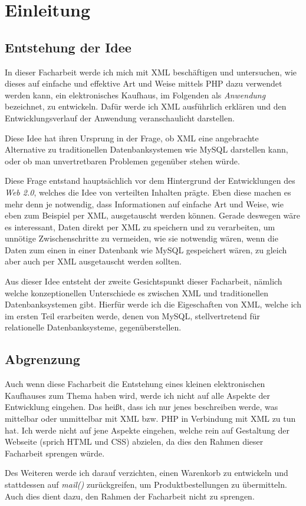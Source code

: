 
\chapter{Einleitung}
\section{Entstehung der Idee}
In dieser Facharbeit werde ich mich mit XML beschäftigen und
untersuchen, wie dieses auf einfache und effektive Art und Weise
mittels PHP dazu verwendet werden kann, ein elektronisches Kaufhaus,
im Folgenden als {\em Anwendung} bezeichnet, zu entwickeln. Dafür werde
ich XML ausführlich erklären und den Entwicklungsverlauf der Anwendung
veranschaulicht darstellen.

Diese Idee hat ihren Ursprung in der Frage, ob XML eine angebrachte
Alternative zu traditionellen Datenbanksystemen wie MySQL darstellen
kann, oder ob man unvertretbaren Problemen gegenüber stehen würde.

Diese Frage entstand hauptsächlich vor dem Hintergrund der
Entwicklungen des {\em Web 2.0}, welches die Idee von verteilten
Inhalten prägte. Eben diese machen es mehr denn je notwendig, dass
Informationen auf einfache Art und Weise, wie eben zum Beispiel per XML,
ausgetauscht werden können. Gerade deswegen wäre es interessant, Daten
direkt per XML zu speichern und zu verarbeiten, um unnötige
Zwischenschritte zu vermeiden, wie sie notwendig wären, wenn die Daten
zum einen in einer Datenbank wie MySQL gespeichert wären, zu gleich
aber auch per XML ausgetauscht werden sollten.

Aus dieser Idee entsteht der zweite Gesichtspunkt dieser Facharbeit,
nämlich welche konzeptionellen Unterschiede es zwischen XML und
traditionellen Datenbanksystemen gibt. Hierfür werde ich die
Eigeschaften von XML, welche ich im ersten Teil erarbeiten werde,
denen von MySQL, stellvertretend für relationelle Datenbanksysteme,
gegenüberstellen.

\section{Abgrenzung}
Auch wenn diese Facharbeit die Entstehung eines kleinen elektronischen
Kaufhauses zum Thema haben wird, werde ich nicht auf alle Aspekte der
Entwicklung eingehen. Das heißt, dass ich nur jenes beschreiben werde,
was mittelbar oder unmittelbar mit XML bzw. PHP in Verbindung mit XML
zu tun hat. Ich werde nicht auf jene Aspekte eingehen, welche rein auf
Gestaltung der Webseite (sprich HTML und CSS) abzielen, da dies den
Rahmen dieser Facharbeit sprengen würde.

Des Weiteren werde ich darauf verzichten, einen Warenkorb zu
entwickeln und stattdessen auf {\em mail()} zurückgreifen, um
Produktbestellungen zu übermitteln. Auch dies dient dazu, den Rahmen
der Facharbeit nicht zu sprengen.

